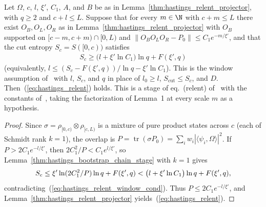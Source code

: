 \begin{lemma}
    \label{thm:hastings_relent_window}
    \leanok
    Let $\Omega$, $c$, $l$, $\xi'$, $C_1$, $A$, and $B$ be as in
    Lemma~\ref{thm:hastings_relent_projector}, with $q\ge2$ and
    $c+l\le L$. Suppose that for every $m\in\N$ with $c+m\le L$ there exist
    $O_B,O_L,O_R$ as in Lemma~\ref{thm:hastings_relent_projector} with $O_B$
    supported on $\lbrack c-m,c+m)\cap\lbrack0,L)$ and
    $\|O_BO_LO_R-P_0\|\le C_1e^{-m/\xi'}$, and that the cut entropy
    $S_c=S(\lbrack0,c))$ satisfies
    \begin{align}
        S_c\ge\bigl(l+\xi'\ln C_1\bigr)\ln q+F(\xi',q)
        \label{eq:hastings_relent_window_cond}
    \end{align}
    (equivalently, $l\le(S_c-F(\xi',q))/\ln q-\xi'\ln C_1$). This is the
    window assumption of~\cite[line 483]{Hastings2007AreaLaw} with $l$, $S_c$,
    and $q$ in place of $l_0\ge l$, $S_{\mathrm{cut}}\le S_c$, and $D$.
    Then~(\ref{eq:hastings_relent}) holds. This is a stage of eq.~(relent)
    of~\cite[lines 427--503]{Hastings2007AreaLaw} with the constants
    of~\cite{gap:hastings07_relent_constants}, taking the factorization of
    Lemma~1 at every scale $m$ as a hypothesis.
\end{lemma}
\begin{proof}\leanok
    Since $\sigma=\rho_{\lbrack0,c)}\otimes\rho_{\lbrack c,L)}$ is a mixture of pure product
    states across $c$ (each of Schmidt rank $k=1$), the overlap is
    $P=\operatorname{tr}(\sigma P_0)=\sum_iw_i|\langle\psi_i,\Omega\rangle|^2$.
    If $P>2C_1e^{-l/\xi'}$, then $2C_1^2/P<C_1e^{l/\xi'}$, so
    Lemma~\ref{thm:hastings_bootstrap_chain_stage} with $k=1$ gives
    \begin{align}
        S_c\le\xi'\ln(2C_1^2/P)\ln q+F(\xi',q)
        <\bigl(l+\xi'\ln C_1\bigr)\ln q+F(\xi',q),
        \notag
    \end{align}
    contradicting~(\ref{eq:hastings_relent_window_cond}). Thus
    $P\le2C_1e^{-l/\xi'}$, and Lemma~\ref{thm:hastings_relent_projector}
    yields~(\ref{eq:hastings_relent}).
\end{proof}


